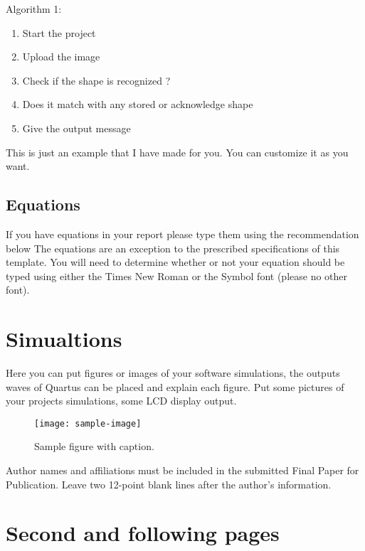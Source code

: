 \documentclass[10pt,sigconf, review]{article}
\begin{document}
Algorithm 1:
\begin{enumerate}
	\item Start the project
	\item Upload the image 
	\item Check if the shape is recognized ?
  \item Does it match with any stored or acknowledge shape
  \item Give the output message
\end{enumerate}

This is just an example that I have made for you. You can customize it as you
want.

\subsection{Equations}
If you have equations in your report please type them using the recommendation below
The equations are an exception to the prescribed specifications of this
template. You will need to determine whether or not your equation should be
typed using either the Times New Roman or the Symbol font (please no other
font).


\section{Simualtions}
Here you can put figures or images of your software simulations, the outputs
waves of Quartus can be placed and explain each figure. Put some pictures of
your projects simulations, some LCD display output.

\begin{figure}[thb]
    \centering
	\texttt{[image: sample-image]}
	\caption{Sample figure with caption.}
	\label{fig: sample-figure}       %
\end{figure}


Author names and affiliations must be included in the submitted Final Paper for
Publication. Leave two 12-point blank lines after the author’s information. 

\section{Second and following pages}
\label{sect:pdf}
\end{document}
